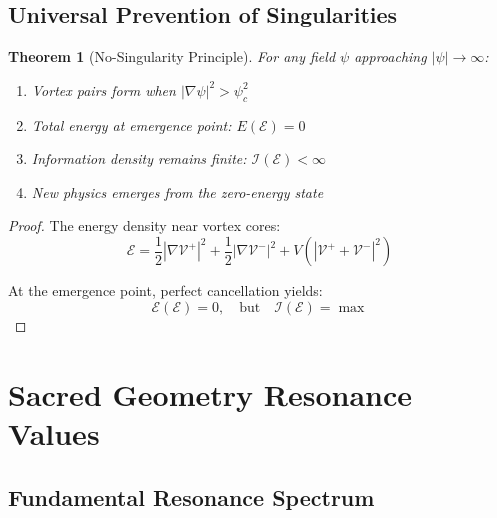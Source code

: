 \documentclass[12pt,letterpaper]{article}
\newcommand{\vortex}{\mathcal{V}}
\newcommand{\emerge}{\mathcal{E}}
\newtheorem{theorem}{Theorem}[section]
\begin{document}
\subsection{Universal Prevention of Singularities}

\begin{theorem}[No-Singularity Principle]
For any field $\psi$ approaching $|\psi| \to \infty$:
\begin{enumerate}
\item Vortex pairs form when $|\nabla\psi|^2 > \psi_c^2$
\item Total energy at emergence point: $E(\emerge) = 0$
\item Information density remains finite: $\mathcal{I}(\emerge) < \infty$
\item New physics emerges from the zero-energy state
\end{enumerate}
\end{theorem}

\begin{proof}
The energy density near vortex cores:
\begin{equation}
\mathcal{E} = \frac{1}{2}|\nabla\vortex^+|^2 + \frac{1}{2}|\nabla\vortex^-|^2 + V(|\vortex^+ + \vortex^-|^2)
\end{equation}

At the emergence point, perfect cancellation yields:
\begin{equation}
\mathcal{E}(\emerge) = 0, \quad \text{but} \quad \mathcal{I}(\emerge) = \max
\end{equation}
\end{proof}

\section{Sacred Geometry Resonance Values}

\subsection{Fundamental Resonance Spectrum}
\end{document}
